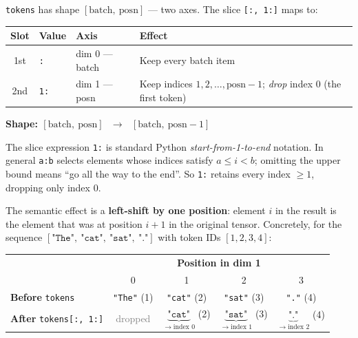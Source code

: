 \documentclass[10pt]{article}
\begin{document}
\texttt{tokens} has shape $[\text{batch},\ \text{posn}]$ --- two axes.
The slice \texttt{[:, 1:]} maps to:

\begin{center}
\begin{tabular}{clll}
\toprule
\textbf{Slot} & \textbf{Value} & \textbf{Axis} & \textbf{Effect} \\
\midrule
1st & \texttt{:}  & dim 0 --- batch & Keep every batch item \\
2nd & \texttt{1:} & dim 1 --- posn  & Keep indices $1, 2, \ldots, \text{posn}-1$;
                                      \emph{drop} index 0 (the first token) \\
\bottomrule
\end{tabular}
\end{center}

\medskip\noindent
\textbf{Shape: $[\text{batch},\ \text{posn}]$
$\;\longrightarrow\;$ $[\text{batch},\ \text{posn}-1]$}

\medskip\noindent
The slice expression \texttt{1:} is standard Python \emph{start-from-1-to-end}
notation. In general \texttt{a:b} selects elements whose indices satisfy
$a \le i < b$; omitting the upper bound means ``go all the way to the end''.
So \texttt{1:} retains every index $\ge 1$, dropping only index 0.

\medskip\noindent
The semantic effect is a \textbf{left-shift by one position}: element $i$ in
the result is the element that was at position $i+1$ in the original tensor.
Concretely, for the sequence
$[\texttt{"The"},\ \texttt{"cat"},\ \texttt{"sat"},\ \texttt{"."}]$
with token IDs $[1, 2, 3, 4]$:

\begin{center}
\begin{tabular}{lcccc}
\toprule
 & \multicolumn{4}{c}{\textbf{Position in dim 1}} \\
 & 0 & 1 & 2 & 3 \\
\midrule
\textbf{Before} \texttt{tokens} &
  \texttt{"The"} (1) & \texttt{"cat"} (2) & \texttt{"sat"} (3) & \texttt{"."} (4) \\
\midrule
\textbf{After} \texttt{tokens[:,\,1:]} &
  \textcolor{gray}{dropped} & $\underbrace{\texttt{"cat"}}_{\to\text{index }0}$ (2) &
  $\underbrace{\texttt{"sat"}}_{\to\text{index }1}$ (3) &
  $\underbrace{\texttt{"."}}_{\to\text{index }2}$ (4) \\
\bottomrule
\end{tabular}
\end{center}
\end{document}
